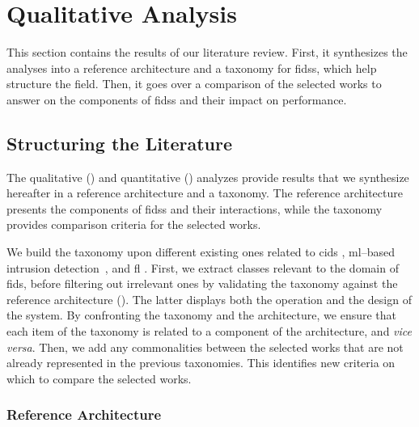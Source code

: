\section{Qualitative Analysis\label{sec:sota.quali}}

This section contains the results of our literature review.
First, it synthesizes the analyses into a reference architecture and a taxonomy for \glspl{fids}, which help structure the field.
Then, it goes over a comparison of the selected works to answer  on the components of \glspl{fids} and their impact on performance.


\subsection{Structuring the Literature\label{sec:sota.quali.structure}}

The qualitative () and quantitative () analyzes provide results that we synthesize hereafter in a reference architecture and a taxonomy.
The reference architecture presents the components of \glspl{fids} and their interactions, while the taxonomy provides comparison criteria for the selected works.

We build the taxonomy upon different existing ones related to \gls{cids}
\cite{vasilomanolakis_TaxonomySurveyCollaborative_2015,zhou_surveycoordinatedattacks_2010}, \gls{ml}--based intrusion detection~\cite{dacosta_InternetThingssurvey_2019}, and
\gls{fl} \cite{aledhari_FederatedLearningSurvey_2020,lyu_ThreatsFederatedLearning_2020,mothukuri_surveysecurityprivacy_2021}.
First, we extract classes relevant to the domain
of \gls{fids}, before filtering out irrelevant ones by validating the taxonomy against the reference architecture ().
The latter displays both the operation and
the design of the system.
By confronting the taxonomy and the architecture, we ensure that each item
of the taxonomy is related to a component of the architecture, and \emph{vice versa}.
Then, we add any commonalities between the selected works that are not already represented in the previous taxonomies.
This identifies new criteria on which to compare the selected works.


\subsubsection{Reference Architecture\label{sec:sota.discuss.synthesis.archi}}

